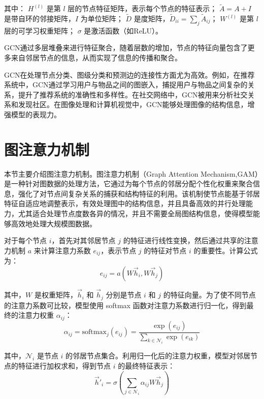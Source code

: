\documentclass[promaster]{thesis-uestc}
\begin{document}
其中：
 \( H^{(l)} \) 是第 \( l \) 层的节点特征矩阵，表示每个节点的特征表示；
 \( \tilde{A} = A + I \) 是带自环的邻接矩阵，\( I \) 为单位矩阵；
 \( \tilde{D} \) 是度矩阵，\( \tilde{D}_{ii} = \sum_j \tilde{A}_{ij} \)；
 \( W^{(l)} \) 是第 \( l \) 层的可学习权重矩阵；
 \( \sigma \) 是激活函数（如ReLU）。

GCN通过多层堆叠来进行特征聚合，随着层数的增加，节点的特征向量包含了更多来自邻居节点的信息，从而实现了信息的传播和聚合。

GCN在处理节点分类、图级分类和预测边的连接性方面尤为高效。例如，在推荐系统中，GCN通过学习用户与物品之间的图嵌入，捕捉用户与物品之间复杂的关系，提升了推荐系统的准确性和多样性。在社交网络中，GCN被用来分析社交关系和发现社区。在图像处理和计算机视觉中，GCN能够处理图像的结构信息，增强模型的表现力。

\section{图注意力机制}
本节主要介绍图注意力机制。图注意力机制（Graph Attention Mechanism,GAM）是一种针对图数据的处理方法，它通过为每个节点的邻居分配个性化权重来聚合信息，强化了对节点间复杂关系的捕获和结构特征的利用。该机制使节点能基于邻居特征自适应地调整表示，有效处理图中的结构信息，并且具备高效的并行处理能力，尤其适合处理节点度数各异的情况，并且不需要全局图结构信息，使得模型能够高效地处理大规模图数据。

对于每个节点 \(i\)，首先对其邻居节点 \(j\) 的特征进行线性变换，然后通过共享的注意力机制 \(a\) 来计算注意力系数 \(e_{ij}\)，表示节点 \(j\) 的特征对节点 \(i\) 的重要性。计算公式为：
\begin{equation}
    e_{ij} = a(W\vec{h}_i, W\vec{h}_j)
\end{equation}

其中，\( W \) 是权重矩阵，\( \vec{h}_i \) 和 \( \vec{h}_j \) 分别是节点 \(i\) 和 \(j\) 的特征向量。为了使不同节点的注意力系数可比较，模型使用 softmax 函数对注意力系数进行归一化，得到最终的注意力权重 \( \alpha_{ij} \)：
\begin{equation}
    \alpha_{ij} = \text{softmax}_j(e_{ij}) = \frac{\exp(e_{ij})}{\sum_{k \in \mathcal{N}_i} \exp(e_{ik})}
\end{equation}

其中，\( \mathcal{N}_i \) 是节点 \(i\) 的邻居节点集合。利用归一化后的注意力权重，模型对邻居节点的特征进行加权求和，得到节点 \(i\) 的最终特征表示：
\begin{equation}
    \vec{h}'_i = \sigma\left( \sum_{j \in \mathcal{N}_i} \alpha_{ij} W\vec{h}_j \right)
\end{equation}
\end{document}
